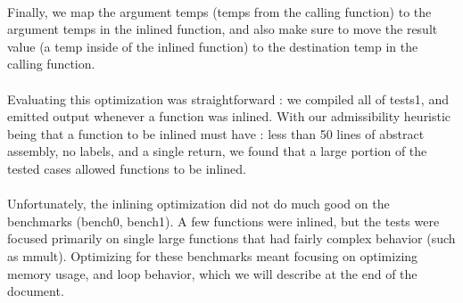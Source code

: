 \documentclass[11pt]{article}
\begin{document}
\\
Finally,
we map the argument temps (temps from the calling function) to the argument temps in the inlined function,
and also make sure to move the result value (a temp inside of the inlined function) to the destination temp
in the calling function. \\
\\
Evaluating this optimization was straightforward : we compiled all of tests1, and emitted output whenever 
a function was inlined. With our admissibility heuristic being that a function to be inlined must have :
less than 50 lines of abstract assembly, no labels, and a single return, we found that a large portion
of the tested cases allowed functions to be inlined.\\
\\
Unfortunately, the inlining optimization did not do much good on the benchmarks (bench0, bench1). A few
functions were inlined, but the tests were focused primarily on single large functions that had fairly
complex behavior (such as mmult). Optimizing for these benchmarks meant focusing on optimizing memory 
usage, and loop behavior, which we will describe at the end of the document. 
\end{document}
